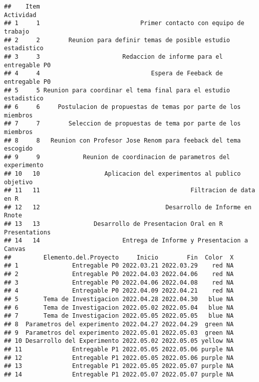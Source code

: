 \documentclass[
]{article}
\begin{document}
\begin{verbatim}
##    Item                                                        Actividad
## 1     1                            Primer contacto con equipo de trabajo
## 2     2        Reunion para definir temas de posible estudio estadistico
## 3     3                       Redaccion de informe para el entregable P0
## 4     4                               Espera de Feeback de entregable P0
## 5     5 Reunion para coordinar el tema final para el estudio estadistico
## 6     6     Postulacion de propuestas de temas por parte de los miembros
## 7     7        Seleccion de propuestas de tema por parte de los miembros
## 8     8   Reunion con Profesor Jose Renom para feeback del tema escogido
## 9     9            Reunion de coordinacion de parametros del experimento
## 10   10                  Aplicacion del experimentos al publico objetivo
## 11   11                                          Filtracion de data en R
## 12   12                                   Desarrollo de Informe en Rnote
## 13   13               Desarrollo de Presentacion Oral en R Presentations
## 14   14                       Entrega de Informe y Presentacion a Canvas
##         Elemento.del.Proyecto     Inicio        Fin  Color  X
## 1               Entregable P0 2022.03.21 2022.03.29    red NA
## 2               Entregable P0 2022.04.03 2022.04.06    red NA
## 3               Entregable P0 2022.04.06 2022.04.08    red NA
## 4               Entregable P0 2022.04.09 2022.04.21    red NA
## 5       Tema de Investigacion 2022.04.28 2022.04.30   blue NA
## 6       Tema de Investigacion 2022.05.02 2022.05.04   blue NA
## 7       Tema de Investigacion 2022.05.05 2022.05.05   blue NA
## 8  Parametros del experimento 2022.04.27 2022.04.29  green NA
## 9  Parametros del experimento 2022.05.01 2022.05.03  green NA
## 10 Desarrollo del Experimento 2022.05.02 2022.05.05 yellow NA
## 11              Entregable P1 2022.05.05 2022.05.06 purple NA
## 12              Entregable P1 2022.05.05 2022.05.06 purple NA
## 13              Entregable P1 2022.05.05 2022.05.07 purple NA
## 14              Entregable P1 2022.05.07 2022.05.07 purple NA
\end{verbatim}
\end{document}
